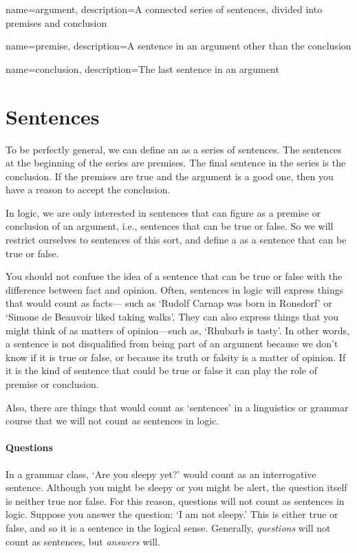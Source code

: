 {
name=argument,
description={A connected series of sentences, divided into \gls{premise}s and \gls{conclusion}}
}

{
name=premise,
description={A sentence in an \gls{argument} other than the \gls{conclusion}}
}

{
name=conclusion,
description={The last sentence in an \gls{argument}}
}


\section{Sentences}
\label{intro.sentences}

To be perfectly general, we can define an  as a series of sentences. The sentences at the beginning of the series are premises. The final sentence in the series is the conclusion. If the premises are true and the argument is a good one, then you have a reason to accept the conclusion.

In logic, we are only interested in sentences that can figure as a premise or conclusion of an argument, i.e., sentences that can be true or false.  So we will restrict ourselves to sentences of this sort, and define a  as a sentence that can be true or false.

You should not confuse the idea of a sentence that can be true or false with the difference between fact and opinion. Often, sentences in logic will express things that would count as facts--- such as `Rudolf Carnap was born in Ronsdorf' or `Simone de Beauvoir liked taking walks'. They can also express things that you might think of as matters of opinion---such as, `Rhubarb is tasty'. In other words, a sentence is not disqualified from being part of an argument because we don't know if it is true or false, or because its truth or falsity is a matter of opinion. If it is the kind of sentence that could be true or false it can play the role of premise or conclusion. 

Also, there are things that would count as `sentences' in a linguistics or grammar course that we will not count as sentences in logic.

\paragraph{Questions} In a grammar class, `Are you sleepy yet?' would count as an interrogative sentence. Although you might be sleepy or you might be alert, the question itself is neither true nor false. For this reason, questions will not count as sentences in logic. Suppose you answer the question: `I am not sleepy.' This is either true or false, and so it is a sentence in the logical sense. Generally, \emph{questions} will not count as sentences, but \emph{answers} will.

